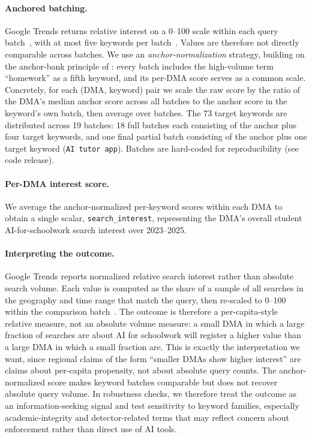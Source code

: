 \documentclass[11pt]{article}
\begin{document}
\paragraph{Anchored batching.}
Google Trends returns relative interest on a 0--100 scale within each query batch~\citep{googletrends}, with at most five keywords per batch~\citep{googletrends_api_2025}. Values are therefore not directly comparable across batches. We use an \emph{anchor-normalization} strategy, building on the anchor-bank principle of \citet{west2020}: every batch includes the high-volume term ``homework'' as a fifth keyword, and its per-DMA score serves as a common scale. Concretely, for each (DMA, keyword) pair we scale the raw score by the ratio of the DMA's median anchor score across all batches to the anchor score in the keyword's own batch, then average over batches. The 73 target keywords are distributed across 19 batches: 18 full batches each consisting of the anchor plus four target keywords, and one final partial batch consisting of the anchor plus one target keyword (\texttt{AI tutor app}). Batches are hard-coded for reproducibility (see code release).

\paragraph{Per-DMA interest score.}
We average the anchor-normalized per-keyword scores within each DMA to obtain a single scalar, \texttt{search\_interest}, representing the DMA's overall student AI-for-schoolwork search interest over 2023--2025.

\paragraph{Interpreting the outcome.}
Google Trends reports normalized relative search interest rather than absolute search volume. Each value is computed as the share of a sample of all searches in the geography and time range that match the query, then re-scaled to 0--100 within the comparison batch~\citep{googletrends}. The outcome is therefore a per-capita-style relative measure, not an absolute volume measure: a small DMA in which a large fraction of searches are about AI for schoolwork will register a higher value than a large DMA in which a small fraction are. This is exactly the interpretation we want, since regional claims of the form ``smaller DMAs show higher interest'' are claims about per-capita propensity, not about absolute query counts. The anchor-normalized score makes keyword batches comparable but does not recover absolute query volume. In robustness checks, we therefore treat the outcome as an information-seeking signal and test sensitivity to keyword families, especially academic-integrity and detector-related terms that may reflect concern about enforcement rather than direct use of AI tools.
\end{document}
